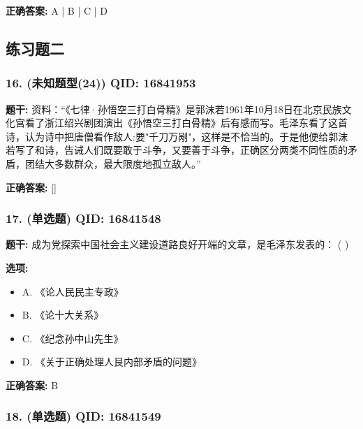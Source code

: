 \documentclass[12pt,UTF8]{ctexart}
\begin{document}
\textbf{正确答案:}
A | B | C | D

\vspace{0.3em}\hrulefill\vspace{0.7em}

\subsection*{练习题二}

\subsubsection*{16. (未知题型(24)) \small QID: 16841953}

\textbf{题干:}
资料：“《七律·孙悟空三打白骨精》是郭沫若1961年10月18日在北京民族文化宫看了浙江绍兴剧团演出《孙悟空三打白骨精》后有感而写。毛泽东看了这首诗，认为诗中把唐僧看作敌人:要"千刀万剐"，这样是不恰当的。于是他便给郭沫若写了和诗，告诫人们既要敢于斗争，又要善于斗争，正确区分两类不同性质的矛盾，团结大多数群众，最大限度地孤立敌人。”

\textbf{正确答案:}
[]

\vspace{0.3em}\hrulefill\vspace{0.7em}

\subsubsection*{17. (单选题) \small QID: 16841548}

\textbf{题干:}
成为党探索中国社会主义建设道路良好开端的文章，是毛泽东发表的： ( )

\textbf{选项:}
\begin{itemize}[leftmargin=*]

  \item A. 《论人民民主专政》

  \item B. 《论十大关系》

  \item C. 《纪念孙中山先生》

  \item D. 《关于正确处理人艮内部矛盾的问题》

\end{itemize}

\textbf{正确答案:}
B

\vspace{0.3em}\hrulefill\vspace{0.7em}

\subsubsection*{18. (单选题) \small QID: 16841549}
\end{document}
